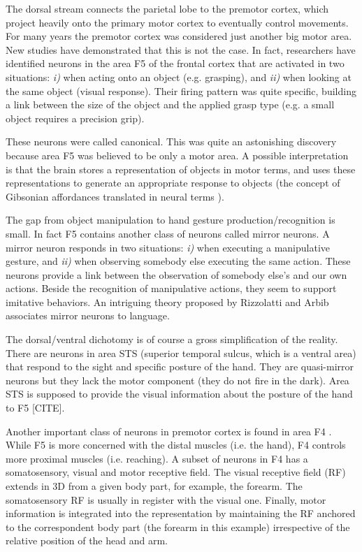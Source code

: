 The dorsal stream connects the parietal lobe to the premotor cortex,
which project heavily onto the primary motor cortex to eventually
control movements.  For many years the premotor cortex was considered
just another big motor area.  New studies
\cite{jeannerod97cognitive} have demonstrated that this is not the
case.  In fact, researchers have identified neurons in the area F5 of
the frontal cortex \cite{fadiga00visuomotor} that are activated in two
situations: {\it i)} when acting onto an object (e.g. grasping), and
{\it ii)} when looking at the same object (visual response). Their
firing pattern was quite specific, building a link between the size of
the object and the applied grasp type (e.g. a small object requires a
precision grip).
 
These neurons were called canonical. This was quite an astonishing
discovery because area F5 was believed to be only a motor area. A
possible interpretation is that the brain stores a representation of
objects in motor terms, and uses these representations to generate an
appropriate response to objects (the concept of Gibsonian affordances
translated in neural terms \cite{gibson77theory}).

The gap from object manipulation to hand gesture
production/recognition is small.  In fact F5 contains another class of
neurons called mirror neurons. A mirror neuron responds in two
situations: {\it i)} when executing a manipulative gesture, and {\it
ii)} when observing somebody else executing the same action. These
neurons provide a link between the observation of somebody else's
and our own actions.  Beside the recognition of manipulative actions,
they seem to support imitative behaviors. An intriguing theory
proposed by Rizzolatti and Arbib \cite{rizzolatti98language}
associates mirror neurons to language.

\ifverbose
The dorsal/ventral dichotomy is of course a gross simplification of
the reality.  There are neurons in area STS (superior temporal sulcus,
which is a ventral area) that respond to the sight and specific
posture of the hand. They are quasi-mirror neurons but they lack the
motor component (they do not fire in the dark).  Area STS is supposed
to provide the visual information about the posture of the hand to F5
[CITE].
\fi

Another important class of neurons in premotor cortex is found in area
F4 \cite{fogassi96coding}. While F5 is more concerned with the distal
muscles (i.e. the hand), F4 controls more proximal muscles
(i.e. reaching). A subset of neurons in F4 has a somatosensory, visual
and motor receptive field. The visual receptive field (RF) extends in
3D from a given body part, for example, the forearm. The somatosensory
RF is usually in register with the visual one. Finally, motor
information is integrated into the representation by maintaining the
RF anchored to the correspondent body part (the forearm in this
example) irrespective of the relative position of the head and arm.


